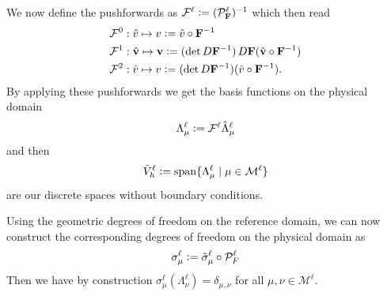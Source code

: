 \documentclass[../master_thesis.tex]{subfiles}
\begin{document}
We now define the pushforwards as 
$\mathcal{F}^\ell \vcentcolon= (\mathcal{P}_\mathbf{F}^\ell)^{-1}$ 
which then read
\begin{align*}
    &\mathcal{F}^0:  \hat{v}\mapsto v  \vcentcolon= \hat{v} \circ \mathbf{F}^{-1}
    \\ &\mathcal{F}^1: \hat{\mathbf{v}}  \mapsto \mathbf{v}
        \vcentcolon= (\det D\mathbf{F}^{-1}) \,D\mathbf{F} (\hat{\mathbf{v}} \circ \mathbf{F}^{-1})
    \\ &\mathcal{F}^2:  \hat{v} \mapsto  v\vcentcolon= (\det D\mathbf{F}^{-1}) (\hat{v}\circ \mathbf{F}^{-1}).
\end{align*}
By applying these pushforwards we get the basis functions on the physical domain
\begin{align*}
    \Lambda^\ell_{\mu} \vcentcolon= \mathcal{F}^\ell \hat{\Lambda}^\ell_{\mu}
\end{align*}
and then 
\begin{align*}
    \bar{V}_h^\ell \vcentcolon= \text{span} \{ \Lambda^\ell_{\mu} \mid \mu \in \mathcal{M}^\ell \}
\end{align*}
are our discrete spaces without boundary conditions.

Using the geometric degrees of freedom on the reference domain, we can now construct the corresponding 
degrees of freedom on the physical domain as
\begin{align*}
    \sigma^\ell_\mu \vcentcolon= \hat{\sigma}_\mu^\ell \circ \mathcal{P}_F^\ell
\end{align*}
Then we have by construction 
$\sigma^\ell_\mu(\Lambda^\ell_{\nu}) = \delta_{\mu,\nu}$ for all $\mu, \nu \in \mathcal{M}^\ell$.


\end{document}
